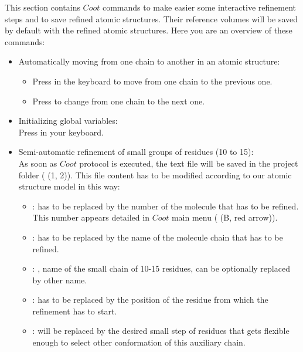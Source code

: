 \begin{itemize}
\begin{itemize}
    This section contains $Coot$ commands to make easier some interactive refinement steps and to save refined atomic structures. Their reference volumes will be saved by default with the refined atomic structures. Here you are an overview of these commands:\\
    \begin{itemize}
     \item Automatically moving from one chain to another in an atomic structure:\\
     \begin{itemize}
      \item Press  in the keyboard to move from one chain to the previous one.\\
      \item Press  to change from one chain to the next one.\\
     \end{itemize} 
     \item Initializing global variables:\\
     Press  in your keyboard.\\ 
     \item Semi-automatic refinement of small groups of residues (10 to 15):\\As soon as $Coot$ protocol is executed, the text file  will be saved in the project folder  ( (1, 2)). This file content has to be modified according to our atomic structure model in this way:\\
     \begin{itemize}

      \item {}:  has to be replaced by the number of the molecule that has to be refined. This number appears detailed in $Coot$ main menu  ( (B, red arrow)).\\
      \item {}:  has to be replaced by the name of the molecule chain that has to be refined.\\
      \item {}: , name of the small chain of 10-15 residues, can be optionally replaced by other name.\\
      \item {}:  has to be replaced by the position of the residue from which the refinement has to start.\\
      \item {}:  will be replaced by the desired small step of residues that gets flexible enough to select other conformation of this auxiliary chain.\\


\end{itemize}
\end{itemize}
\end{itemize}
\end{itemize}
